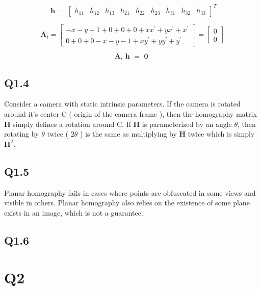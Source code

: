 \documentclass[12pt]{article}
\begin{document}
$$
\textbf { h } = 
\begin{bmatrix}
h_{11} & h_{12} & h_{13} & h_{21} & h_{22} & h_{23} & h_{31} & h_{32} & h_{33} 
\end{bmatrix}^{T}
$$

$$
\textbf{A}_{i} = 
\begin{bmatrix}
- x 
- y 
- 1
+ 0 + 0 + 0
+ x  x^{ \prime }
+ y  x^{ \prime }
+ x^{ \prime }   \\
0 + 0 + 0
- x 
- y 
- 1
+ x y^{ \prime } 
+ y y^{ \prime } 
+   y^{ \prime } 
\end{bmatrix}
=
\begin{bmatrix}
0 \\ 0
\end{bmatrix}
$$

$$
\textbf{A}_{i} 
\textbf { h } =  \textbf { 0 }
$$


\subsection{Q1.4}
Consider a camera with static intrinsic parameters. If the camera is rotated around it's center C ( origin of the camera frame ), then the homography matrix $\textbf{H}$ simply defines a rotation around C. If  $\textbf{H}$ is parameterized by an angle $\theta$, then rotating by $\theta$ twice ( $2 \theta$ ) is the same as multiplying by $\textbf{H}$ twice which is simply $\textbf{H}^{2}$.

\subsection{Q1.5}
Planar homography fails in cases where points are obfuscated in some views and visible in others. Planar homography also relies on the existence of some plane exists in an image, which is not a guarantee.
\subsection{Q1.6}

\section{Q2}
\end{document}

